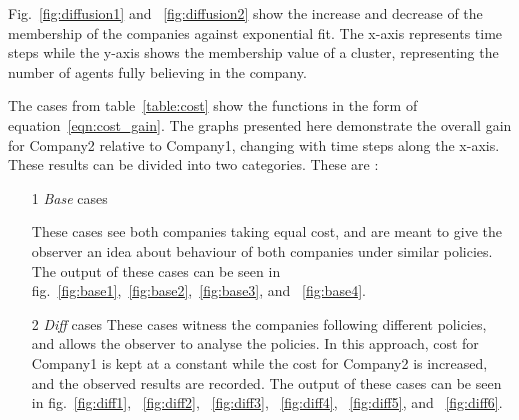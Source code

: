 Fig.~\ref{fig:diffusion1} and ~\ref{fig:diffusion2} show the increase and decrease of the membership of the companies against exponential fit. The x-axis represents time steps while the y-axis shows the membership value of a cluster, representing the number of agents fully believing in the company.

The cases from table~\ref{table:cost} show the functions in the form of equation~\ref{eqn:cost_gain}. The graphs presented here demonstrate the overall gain for Company2 relative to Company1, changing with time steps along the x-axis. These results can be divided into two categories. These are :

\begin{enumerate}
\item[1] \emph{Base} cases

These cases see both companies taking equal cost, and are meant to give the observer an idea about behaviour of both companies under similar policies. The output of these cases can be seen in fig.~\ref{fig:base1},~\ref{fig:base2},~\ref{fig:base3}, and ~\ref{fig:base4}.

\item[2] \emph{Diff} cases
These cases witness the companies following different policies, and allows the observer to analyse the policies. In this approach, cost for Company1 is kept at a constant while the cost for Company2 is increased, and the observed results are recorded. 
The output of these cases can be seen in fig.~\ref{fig:diff1}, ~\ref{fig:diff2}, ~\ref{fig:diff3}, ~\ref{fig:diff4}, ~\ref{fig:diff5}, and ~\ref{fig:diff6}. 

\end{enumerate}

